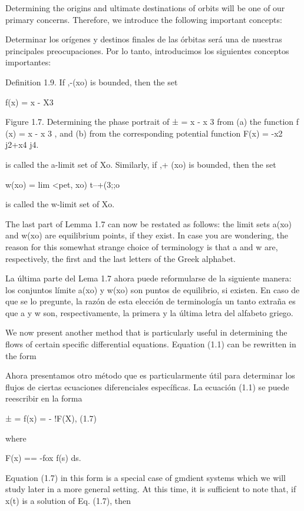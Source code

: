 \documentclass[]{article}
\begin{document}
{Determining the origins and ultimate destinations of orbits will be one of our primary concerns. Therefore, we introduce the following important concepts:

Determinar los orígenes y destinos finales de las órbitas será una de nuestras principales preocupaciones. Por lo tanto, introducimos los siguientes conceptos importantes:

Definition 1.9. If ,-(xo) is bounded, then the set

f(x) = x - X3


Figure 1.7. Determining the phase portrait of ± = x - x 3 from (a) the function f (x) = x - x 3 , and (b) from the corresponding potential function F(x) = -x2 j2+x4 j4.

is called the a-limit set of Xo. Similarly, if ,+ (xo) is bounded, then the set

w(xo) = lim <pet, xo)
t--+(3;;o

is called the w-limit set of Xo.

The last part of Lemma 1.7 can now be restated as follows: the limit sets a(xo) and w(xo) are equilibrium points, if they exist. In case you are wondering, the reason for this somewhat strange choice of terminology is that a and w are, respectively, the first and the last letters of the Greek alphabet.

La última parte del Lema 1.7 ahora puede reformularse de la siguiente manera: los conjuntos límite a(xo) y w(xo) son puntos de equilibrio, si existen. En caso de que se lo pregunte, la razón de esta elección de terminología un tanto extraña es que a y w son, respectivamente, la primera y la última letra del alfabeto griego.

We now present another method that is particularly useful in determining the flows of certain specific differential equations. Equation (1.1) can be rewritten in the form

Ahora presentamos otro método que es particularmente útil para determinar los flujos de ciertas ecuaciones diferenciales específicas. La ecuación (1.1) se puede reescribir en la forma

± = f(x) = - !F(X), (1.7)

where

F(x) == -fox f(s) ds.

Equation (1.7) in this form is a special case of gmdient systems which we will study later in a more general setting. At this time, it is sufficient to note that, if x(t) is a solution of Eq. (1.7), then

}
\end{document}
